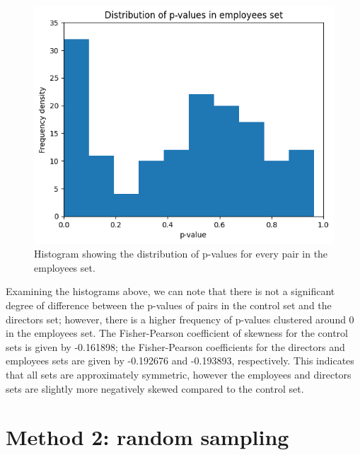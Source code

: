 \documentclass{UoYCSproject}
\begin{document}
\begin{figure}[h!]
\begin{center}
\includegraphics[scale=0.7]{"./images/employees_histogram"}
\end{center}
\caption{Histogram showing the distribution of p-values for every pair in the employees set.}
\end{figure}

Examining the histograms above, we can note that there is not a significant degree of difference between the p-values of pairs in the control set and the directors set; however, there is a higher frequency of p-values clustered around 0 in the employees set. The Fisher-Pearson coefficient of skewness for the control sets is given by -0.161898; the Fisher-Pearson coefficients for the directors and employees sets are given by -0.192676 and -0.193893, respectively. This indicates that all sets are approximately symmetric, however the employees and directors sets are slightly more negatively skewed compared to the control set.

\section{Method 2: random sampling}
\end{document}
